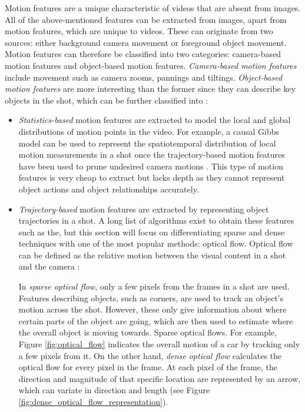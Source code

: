 Motion features are a unique characteristic of videos that are absent from images. All of the above-mentioned features can be extracted from images, apart from motion features, which are unique to videos. These can originate from two sources: either background camera movement or foreground object movement. Motion features can therefore be classified into two categories: camera-based motion features and object-based motion features. \textit{Camera-based motion features} include movement such as camera zooms, pannings and tiltings. \textit{Object-based motion features} are more interesting than the former since they can describe key objects in the shot, which can be further classified into \cite{hu2011survey}:
\begin{itemize}
    \item \textit{Statistics-based} motion features are extracted to model the local and global distributions of motion points in the video. For example, a causal Gibbs model can be used to represent the spatiotemporal distribution of local motion measurements in a shot once the trajectory-based motion features have been used to prune undesired camera motions \cite{fablet2002gibbsmodel}. This type of motion features is very cheap to extract but lacks depth as they cannot represent object actions and object relationships accurately.
    \item \textit{Trajectory-based} motion features are extracted by representing object trajectories in a shot. A long list of algorithms exist to obtain these features such as the, but this section will focus on differentiating sparse and dense techniques with one of the most popular methods: optical flow. Optical flow can be defined as the relative motion between the visual content in a shot and the camera \cite{bradski2008opencv}:
    
    In \textit{sparse optical flow}, only a few pixels from the frames in a shot are used. Features describing objects, such as corners, are used to track an object's motion across the shot. However, these only give information about where certain parts of the object are going, which are then used to estimate where the overall object is moving towards. Sparse optical flows. For example, Figure \ref{fig:optical_flow} indicates the overall motion of a car by tracking only a few pixels from it. On the other hand, \textit{dense optical flow} calculates the optical flow for every pixel in the frame. At each pixel of the frame, the direction and magnitude of that specific location are represented by an arrow, which can variate in direction and length (see Figure \ref{fig:dense_optical_flow_representation}).
    

\end{itemize}

